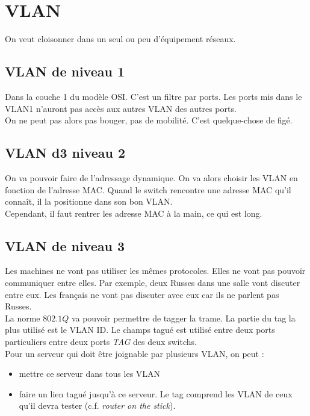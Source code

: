 \section{VLAN}
On veut cloisonner dans un seul ou peu d'équipement réseaux.\\
\subsection{VLAN de niveau 1}
Dans la couche 1 du modèle OSI. C'est un filtre par ports. Les ports mis dans le VLAN1 n'auront pas accès aux autres VLAN des autres ports.\\
On ne peut pas alors pas bouger, pas de mobilité. C'est quelque-chose de figé.
\subsection{VLAN d3 niveau 2}
On va pouvoir faire de l'adressage dynamique. On va alors choisir les VLAN en fonction de l'adresse MAC. Quand le switch rencontre une adresse MAC qu'il connaît, il la positionne dans son bon VLAN.\\
Cependant, il faut rentrer les adresse MAC à la main, ce qui est long.
\subsection{VLAN de niveau 3}
Les machines ne vont pas utiliser les mêmes protocoles. Elles ne vont pas pouvoir communiquer entre elles. Par exemple, deux Russes dans une salle vont discuter entre eux. Les français ne vont pas discuter avec eux car ils ne parlent pas Russes.\\
La norme $802.1Q$ va pouvoir permettre de tagger la trame. La partie du tag la plus utilisé est le VLAN ID. Le champs tagué est utilisé entre deux ports particuliers entre deux ports \textit{TAG} des deux switchs.\\
Pour un serveur qui doit être joignable par plusieurs VLAN, on peut :
\begin{itemize}
 \item mettre ce serveur dans tous les VLAN
 \item faire un lien tagué jusqu'à ce serveur. Le tag comprend les VLAN de ceux qu'il devra tester (c.f. \textit{router on the stick}).
\end{itemize}
